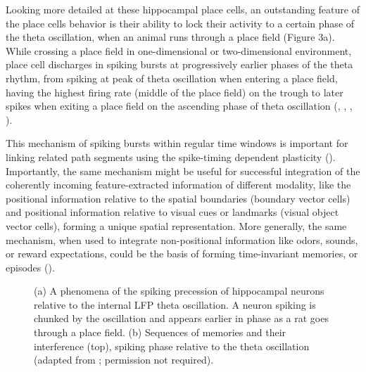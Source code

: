 Looking more detailed at these hippocampal place cells, an outstanding feature of the place cells behavior is their ability to lock their activity to a certain phase of the theta oscillation, when an animal runs through a place field (Figure 3a). While crossing a place field in one-dimensional or two-dimensional environment, place cell discharges in spiking bursts at progressively earlier phases of the theta rhythm, from spiking at peak of theta oscillation when entering a place field, having the highest firing rate (middle of the place field) on the trough to later spikes when exiting a place field on the ascending phase of theta oscillation (\cite{Jensen1996}, \cite{Skaggs1996}, \cite{Tsodyks1996}, \cite{Dragoi2006}).

This mechanism of spiking bursts within regular time windows is important for linking related path segments using the spike-timing dependent plasticity (\cite{Dan2004}). Importantly, the same mechanism might be useful for successful integration of the coherently incoming feature-extracted information of different modality, like the positional information relative to the spatial boundaries (boundary vector cells) and positional information relative to visual cues or landmarks (visual object vector cells), forming a unique spatial representation. More generally, the same mechanism, when used to integrate non-positional information like odors, sounds, or reward expectations, could be the basis of forming time-invariant memories, or episodes (\cite{Buzsaki2018}).


\begin{figure}
\captionsetup{format=plain}
\caption[Theta phase precession]{
(a) A phenomena of the spiking precession of hippocampal neurons relative to the internal LFP theta oscillation. A neuron spiking is chunked by the oscillation and appears earlier in phase as a rat goes through a place field. (b) Sequences of memories and their interference (top), spiking phase relative to the theta oscillation (adapted from \cite{Geisler2010}; permission not required).
}
\label{fig:F3_phase_precession}
\end{figure}



